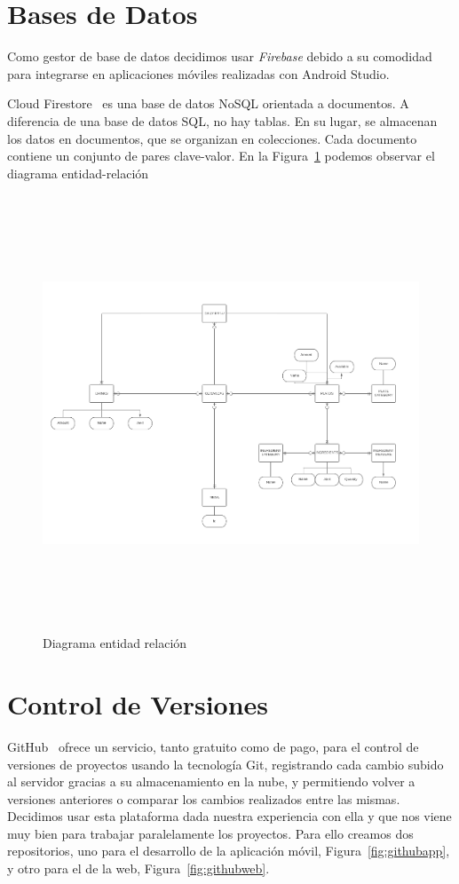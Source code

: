 \section{Bases de Datos}

Como gestor de base de datos decidimos usar \textit{Firebase} debido a su comodidad para integrarse en aplicaciones móviles realizadas con Android Studio.


Cloud Firestore~\citep{firestore} es una base de datos NoSQL orientada a documentos. A diferencia de una base de datos SQL, no hay tablas. En su lugar, se almacenan los datos en documentos, que se organizan en colecciones. Cada documento contiene un conjunto de pares clave-valor. En la Figura~\ref{fig:erd} podemos observar el diagrama entidad-relación

\begin{figure}[h]
\centering
\includegraphics[width=16cm, height=13cm]{Imagenes/Figuras/ERD.png}
\caption{Diagrama entidad relación}\label{fig:erd}
\end{figure} 


\section{Control de Versiones}

GitHub~\citep{github} ofrece un servicio, tanto gratuito como de pago, para el control de versiones de proyectos usando la tecnología Git, registrando cada cambio subido al servidor gracias a su almacenamiento en la nube, y permitiendo volver a versiones anteriores o comparar los cambios realizados entre las mismas.
Decidimos usar esta plataforma dada nuestra experiencia con ella y que nos viene muy bien para trabajar paralelamente los proyectos.
Para ello creamos dos repositorios, uno para el desarrollo de la aplicación móvil, Figura~\ref{fig:githubapp}, y otro para el de la web, Figura~\ref{fig:githubweb}.

